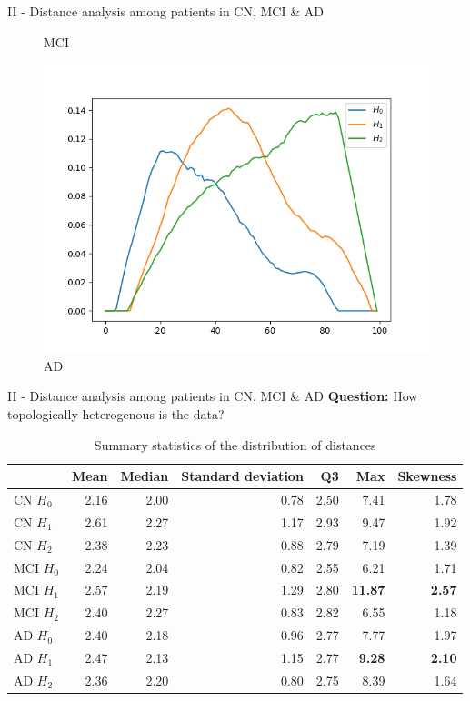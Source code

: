 \documentclass[aspectratio=169, 10pt, dvipsnames]{beamer}
\begin{document}
\begin{frame}[fragile]{II - Distance analysis among patients in CN, MCI \& AD}
\begin{figure}
    \caption{MCI}
  \end{figure}
  \endminipage
  \hfill
  \begin{figure}
    \centering
    \includegraphics[width=\textwidth]{figures/median_pls/median_pl_AD.png}
    \caption{AD}
  \end{figure}
  \endminipage
\end{frame}

\begin{frame}[fragile]{II - Distance analysis among patients in CN, MCI \& AD}
\textbf{Question:} How topologically heterogenous is the data?
\begin{table}
\centering
\begin{tabular}{lrrrrrr}
\toprule
{} &  Mean &  Median &  Standard deviation &   Q3 &   Max &  Skewness \\
\midrule
CN $H_0$ & 2.16 & 2.00 & 0.78 & 2.50 & 7.41 & 1.78 \\
CN $H_1$ & 2.61 & 2.27 & 1.17 & 2.93 & 9.47 & 1.92 \\
CN $H_2$ & 2.38 & 2.23 & 0.88 & 2.79 & 7.19 & 1.39 \\
MCI $H_0$ & 2.24 & 2.04 & 0.82 & 2.55 & 6.21 & 1.71 \\
MCI $H_1$ & 2.57 & 2.19 & 1.29 & 2.80 & \textbf{11.87} & \textbf{2.57} \\
MCI $H_2$ & 2.40 & 2.27 & 0.83 & 2.82 & 6.55 & 1.18 \\
AD $H_0$ & 2.40 & 2.18 & 0.96 & 2.77 & 7.77 & 1.97 \\
AD $H_1$ & 2.47 & 2.13 & 1.15 & 2.77 & \textbf{9.28} & \textbf{2.10} \\
AD $H_2$ & 2.36 & 2.20 & 0.80 & 2.75 & 8.39 & 1.64 \\
  \bottomrule
\end{tabular}
\caption{Summary statistics of the distribution of distances }
\label{tab:stats_median_pl}
\end{table}
\end{frame}
\end{document}

